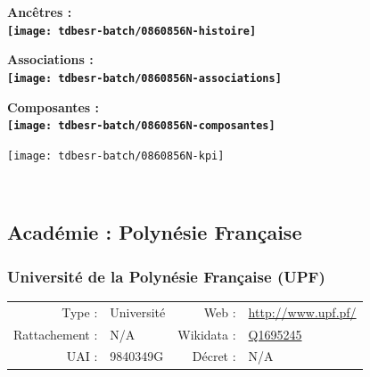 \documentclass[12pt,french,]{article}
\begin{document}
\vspace{1cm}  
\begin{minipage}[b]{0.50\textwidth}\begin{center} \bf Ancêtres : \\  
\texttt{[image: tdbesr-batch/0860856N-histoire]} \end{center}\end{minipage}\begin{minipage}[b]{0.50\textwidth}\begin{center} \bf Associations : \\  
\texttt{[image: tdbesr-batch/0860856N-associations]} \end{center}\end{minipage}

\hrulefill

\begin{center} \bf Composantes : \\  
\texttt{[image: tdbesr-batch/0860856N-composantes]} \end{center}

\begin{center}\texttt{[image: tdbesr-batch/0860856N-kpi]} \end{center}\checkoddpage

\ifoddpage \fi ~\newpage  

\hypertarget{acaduxe9mie-polynuxe9sie-franuxe7aise}{%
\subsection{Académie : Polynésie
Française}\label{acaduxe9mie-polynuxe9sie-franuxe7aise}}

\hypertarget{universituxe9-de-la-polynuxe9sie-franuxe7aise-upf}{%
\subsubsection{Université de la Polynésie Française
(UPF)}\label{universituxe9-de-la-polynuxe9sie-franuxe7aise-upf}}

\begin{tabular*}{\textwidth}{rp{5cm}rl}  
\hline  
Type : & Université & Web : &\href{http://www.upf.pf/}{http://www.upf.pf/} \\  
Rattachement : & N/A & Wikidata : & \href{https://www.wikidata.org/entity/Q1695245}{Q1695245} \\  
UAI : & 9840349G & Décret : & N/A \\  
\hline  
\end{tabular*}
\end{document}
